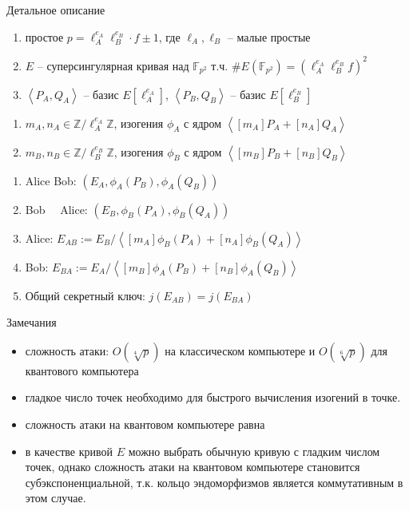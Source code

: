 \documentclass{beamer}
\begin{document}
\begin{frame}{Детальное описание}
    \begin{enumerate}
        \item простое
        $p = \ell_A^{e_A} \ell_B^{e_B} \cdot f \pm 1$, где $\ell_A, \ell_B$ -- малые простые
        \item $E$ -- суперсингулярная кривая над $\mathbb{F}_{p^2}$ т.ч. $\#E(\mathbb{F}_{p^2}) = (\ell_A^{e_A} \ell_{B}^{e_B} f)^2$
        \item $\left<P_A, Q_A\right>$ -- базис $E[\ell_A^{e_A}]$, $\left<P_B, Q_B\right>$ -- базис $E[\ell_B^{e_B}]$
    \end{enumerate}
    \begin{enumerate}
        \item {} $m_A, n_A \in \mathbb{Z}/\ell_A^{e_A} \mathbb{Z}$, изогения $\phi_A$ с ядром $\left< [m_A]P_A + [n_A]Q_A \right>$
        \item {} $m_B, n_B \in \mathbb{Z}/\ell_B^{e_B} \mathbb{Z}$, изогения $\phi_B$ с ядром $\left< [m_B]P_B + [n_B]Q_B \right>$
    \end{enumerate}
\end{frame}

\begin{frame}
    \begin{enumerate}
        \item
        Alice \structure{$\implies$} Bob: $(E_A, \phi_A(P_B), \phi_A(Q_B))$
        \item
        Bob~~ \structure{$\implies$} Alice: $(E_B, \phi_B(P_A), \phi_B(Q_A))$
        \item Alice: $E_{AB} := E_B/\left< [m_A]\phi_B(P_A) + [n_A]\phi_B(Q_A) \right>$
        \item Bob: $E_{BA} := E_A/\left< [m_B]\phi_A(P_B) + [n_B]\phi_A(Q_B) \right>$
        \item Общий секретный ключ: $j(E_{AB}) = j(E_{BA})$
    \end{enumerate}
\end{frame}

\begin{frame}{Замечания}
    \begin{itemize}
        \item сложность атаки: $O(\sqrt[4]{p})$ на классическом компьютере и $O(\sqrt[6]{p})$ для квантового компьютера
        \item гладкое число точек необходимо для быстрого вычисления изогений в точке.
        \item сложность атаки на квантовом компьютере равна 
        \item в качестве кривой $E$ можно выбрать обычную кривую с гладким числом точек, однако сложность атаки на квантовом компьютере становится субэкспоненциальной, т.к. кольцо эндоморфизмов является коммутативным в этом случае.
    \end{itemize}
\end{frame}
\end{document}
